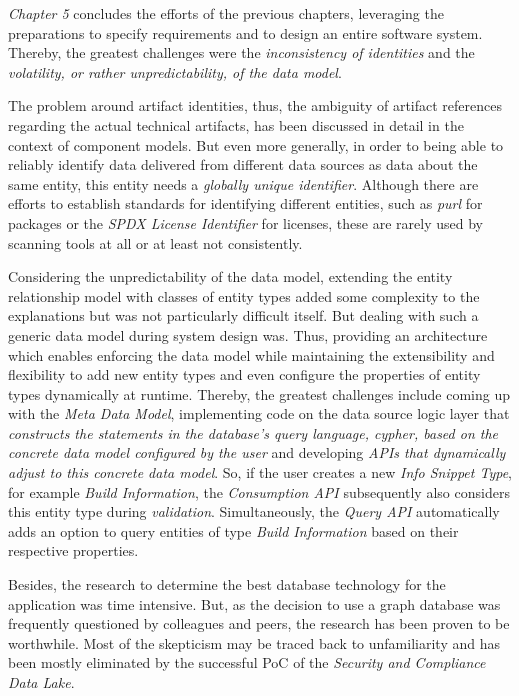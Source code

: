 \emph{Chapter 5} concludes the efforts of the previous chapters, leveraging the preparations to specify requirements and to design an entire software system. Thereby, the greatest challenges were the \emph{inconsistency of identities} and the \emph{volatility, or rather unpredictability, of the data model}.\par
The problem around artifact identities, thus, the ambiguity of artifact references regarding the actual technical artifacts, has been discussed in detail in the context of component models. But even more generally, in order to being able to reliably identify data delivered from different data sources as data about the same entity, this entity needs a \emph{globally unique identifier}. Although there are efforts to establish standards for identifying different entities, such as \emph{purl} for packages or the \emph{SPDX License Identifier} for licenses, these are rarely used by scanning tools at all or at least not consistently.\par
Considering the unpredictability of the data model, extending the entity relationship model with classes of entity types added some complexity to the explanations but was not particularly difficult itself. But dealing with such a generic data model during system design was. Thus,  providing an architecture which enables enforcing the data model while maintaining the extensibility and flexibility to add new entity types and even configure the properties of entity types dynamically at runtime. Thereby, the greatest challenges include coming up with the \emph{Meta Data Model}, implementing code on the data source logic layer that \emph{constructs the statements in the database's query language, cypher, based on the concrete data model configured by the user} and developing \emph{APIs that dynamically adjust to this concrete data model}. So, if the user creates a new \emph{Info Snippet Type}, for example \emph{Build Information}, the \emph{Consumption API} subsequently also considers this entity type during \emph{validation}. Simultaneously, the \emph{Query API} automatically adds an option to query entities of type \emph{Build Information} based on their respective properties.\par
Besides, the research to determine the best database technology for the application was time intensive. But, as the decision to use a graph database was frequently questioned by colleagues and peers, the research has been proven to be worthwhile. Most of the skepticism may be traced back to unfamiliarity and has been mostly eliminated by the successful PoC of the \emph{Security and Compliance Data Lake}.\\

